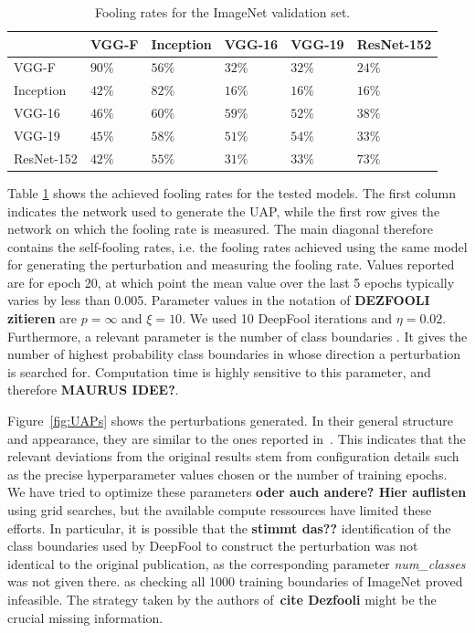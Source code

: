 \documentclass[runningheads]{llncs}
\begin{document}
\begin{table}[]
\centering
\caption{Fooling rates for the ImageNet validation set.}
\begin{tabular}{|l|l|l|l|l|l|}
\hline

			& VGG-F		&	Inception	&	VGG-16		&	VGG-19		&	ResNet-152	\\ \hline
VGG-F		& $90\%$	&	$56\%$		&	$32\%$		&	$32\%$		& 	$24\%$		\\
Inception	& $42\%$	&	$82\%$		&	$16\%$		&	$16\%$		& 	$16\%$	\\
VGG-16		& $46\%$	&	$60\%$		&	$59\%$		&	$52\%$		& 	$38\%$	\\
VGG-19		& $45\%$	&	$58\%$		&	$51\%$		&	$54\%$		& 	$33\%$	\\
ResNet-152	& $42\%$	&	$55\%$		&	$31\%$		&	$33\%$		& 	$73\%$	\\
\hline 
\end{tabular}
\label{tbl_stoerraten_reprod_kreuz_linf}
\end{table}

Table \ref{tbl_stoerraten_reprod_kreuz_linf} shows the achieved fooling rates for the tested models. The first column indicates the network used to generate the UAP, while the first row gives the network on which the fooling rate is measured. 
The main diagonal therefore contains the self-fooling rates, i.e. the fooling rates achieved using the same model for generating the perturbation and measuring the fooling rate. Values reported are for epoch 20, at which point the mean value over the last 5 epochs typically varies by less than 0.005. Parameter values in the notation of {\bf DEZFOOLI zitieren} are \(p=\infty\) and \(\xi=10\). We used 10 DeepFool iterations and \(\eta=0.02\). Furthermore, a relevant parameter is the number of class boundaries
. It gives the number of highest probability class boundaries in whose direction a perturbation is searched for. Computation time is highly sensitive to this parameter, and therefore {\bf MAURUS IDEE?}.

Figure~\ref{fig:UAPs} shows the perturbations generated. In their general structure and appearance, they are similar to the ones reported in~\cite{moosavi-dezfooli_universal_2017-1}. This indicates that the relevant deviations from the original results stem from configuration details such as the precise hyperparameter values chosen or the number of training epochs. We have tried to optimize these parameters {\bf oder auch andere? Hier auflisten} using grid searches, but the available compute ressources have limited these efforts. In particular, it is possible that the {\bf stimmt das??} identification of the class boundaries used by DeepFool to construct the perturbation was not identical to the original publication, as the corresponding parameter {\sl num\_classes} was not given there. as checking all 1000 training boundaries of ImageNet proved infeasible. The strategy taken by the authors of~{\bf cite Dezfooli} might be the crucial missing information.
 
\end{document}
